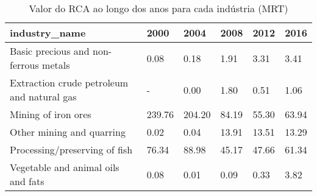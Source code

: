 \begin{table}
\centering
\caption{Valor do RCA ao longo dos anos para cada indústria (MRT)}
\begin{tabular}{p{6cm}p{1.5cm}p{1.5cm}p{1.5cm}p{1.5cm}p{1.5cm}}
\toprule
                             industry\_name &   2000 &   2004 &  2008 &  2012 &  2016 \\
\midrule
     Basic precious and non-ferrous metals &   0.08 &   0.18 &  1.91 &  3.31 &  3.41 \\
Extraction crude petroleum and natural gas &      - &   0.00 &  1.80 &  0.51 &  1.06 \\
                       Mining of iron ores & 239.76 & 204.20 & 84.19 & 55.30 & 63.94 \\
                 Other mining and quarring &   0.02 &   0.04 & 13.91 & 13.51 & 13.29 \\
             Processing/preserving of fish &  76.34 &  88.98 & 45.17 & 47.66 & 61.34 \\
        Vegetable and animal oils and fats &   0.08 &   0.01 &  0.09 &  0.33 &  3.82 \\
\bottomrule
\end{tabular}
\end{table}
